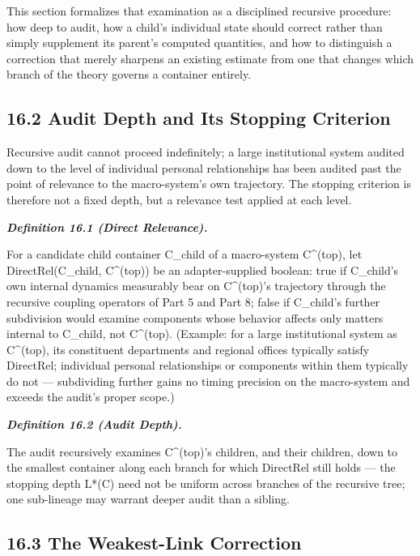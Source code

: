 \documentclass[
]{article}
\begin{document}
This section formalizes that examination as a disciplined recursive
procedure: how deep to audit, how a child's individual state should
correct rather than simply supplement its parent's computed quantities,
and how to distinguish a correction that merely sharpens an existing
estimate from one that changes which branch of the theory governs a
container entirely.

\hypertarget{audit-depth-and-its-stopping-criterion}{%
\subsection{16.2 Audit Depth and Its Stopping
Criterion}\label{audit-depth-and-its-stopping-criterion}}

Recursive audit cannot proceed indefinitely; a large institutional
system audited down to the level of individual personal relationships
has been audited past the point of relevance to the macro-system's own
trajectory. The stopping criterion is therefore not a fixed depth, but a
relevance test applied at each level.

\emph{\textbf{Definition 16.1 (Direct Relevance).}}

For a candidate child container C\_child of a macro-system C\^{}(top),
let DirectRel(C\_child, C\^{}(top)) be an adapter-supplied boolean: true
if C\_child's own internal dynamics measurably bear on C\^{}(top)'s
trajectory through the recursive coupling operators of Part 5 and Part
8; false if C\_child's further subdivision would examine components
whose behavior affects only matters internal to C\_child, not
C\^{}(top). (Example: for a large institutional system as C\^{}(top),
its constituent departments and regional offices typically satisfy
DirectRel; individual personal relationships or components within them
typically do not --- subdividing further gains no timing precision on
the macro-system and exceeds the audit's proper scope.)

\emph{\textbf{Definition 16.2 (Audit Depth).}}

The audit recursively examines C\^{}(top)'s children, and their
children, down to the smallest container along each branch for which
DirectRel still holds --- the stopping depth L*(C) need not be uniform
across branches of the recursive tree; one sub-lineage may warrant
deeper audit than a sibling.

\hypertarget{the-weakest-link-correction}{%
\subsection{16.3 The Weakest-Link
Correction}\label{the-weakest-link-correction}}
\end{document}
